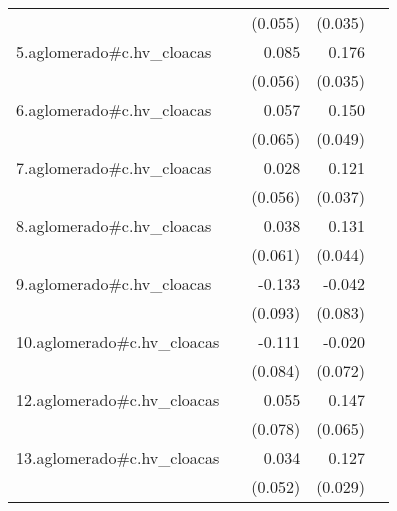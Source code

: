 {\begin{longtable}{l*{4}{D{.}{.}{-1}}}
            &                     &     (0.055)         &     (0.035)         &                     \\
\addlinespace
5.aglomerado#c.hv\_cloacas&                     &       0.085         &       0.176\sym{***}&                     \\
            &                     &     (0.056)         &     (0.035)         &                     \\
\addlinespace
6.aglomerado#c.hv\_cloacas&                     &       0.057         &       0.150\sym{**} &                     \\
            &                     &     (0.065)         &     (0.049)         &                     \\
\addlinespace
7.aglomerado#c.hv\_cloacas&                     &       0.028         &       0.121\sym{***}&                     \\
            &                     &     (0.056)         &     (0.037)         &                     \\
\addlinespace
8.aglomerado#c.hv\_cloacas&                     &       0.038         &       0.131\sym{**} &                     \\
            &                     &     (0.061)         &     (0.044)         &                     \\
\addlinespace
9.aglomerado#c.hv\_cloacas&                     &      -0.133         &      -0.042         &                     \\
            &                     &     (0.093)         &     (0.083)         &                     \\
\addlinespace
10.aglomerado#c.hv\_cloacas&                     &      -0.111         &      -0.020         &                     \\
            &                     &     (0.084)         &     (0.072)         &                     \\
\addlinespace
12.aglomerado#c.hv\_cloacas&                     &       0.055         &       0.147\sym{*}  &                     \\
            &                     &     (0.078)         &     (0.065)         &                     \\
\addlinespace
13.aglomerado#c.hv\_cloacas&                     &       0.034         &       0.127\sym{***}&                     \\
            &                     &     (0.052)         &     (0.029)         &                     \\

\end{longtable}}
